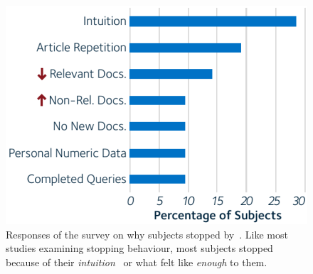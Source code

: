 \begin{figure}
    \begin{center}
    \vspace*{-8mm}
    \includegraphics[width=1\textwidth]{figures/ch3-respondents.pdf}
    \end{center}
    \vspace*{-2mm}
    \caption[Responses of a survey by~\cite{dostert2009satisficing}]{Responses of the survey on why subjects stopped by~\cite{dostert2009satisficing}. Like most studies examining stopping behaviour, most subjects stopped because of their \emph{intuition} \textemdash~or what felt like \emph{enough} to them.}
    \label{fig:stopping_respondents}
\end{figure}

